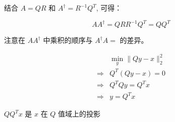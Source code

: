 结合 $A=Q R$ 和 $A^{\dagger}=R^{-1} Q^{T}$, 可得：

$$
A A^{\dagger}=Q R R^{-1} Q^{T}=Q Q^{T}
$$

\begin{remark}
    注意在 $A A^{\dagger}$ 中乘积的顺序与 $A^{\dagger} A=$ 的差异。
\end{remark}

$$
\begin{aligned}
&\min _{y}\|Q y-x\|_{2}^{2}\\
 \Rightarrow& Q^{T}(Q y-x)=0 \\
\Rightarrow& Q^{T} Q y=Q^{T} x\\ 
\Rightarrow & y=Q^{T} x
\end{aligned}
$$

$Q Q^{T} x$ 是 $x$ 在 $Q$ 值域上的投影




